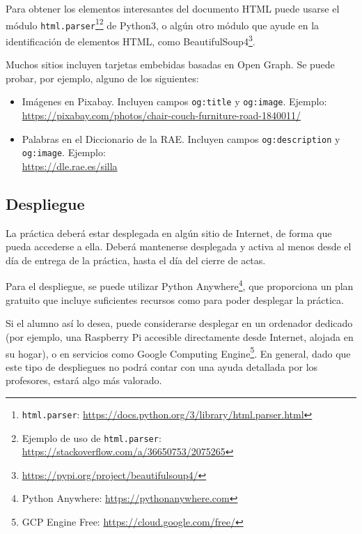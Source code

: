 Para obtener los elementos interesantes del documento HTML puede usarse el módulo \texttt{html.parser}\footnote{\texttt{html.parser}: \url{https://docs.python.org/3/library/html.parser.html}}\footnote{Ejemplo de uso de \texttt{html.parser}: \url{https://stackoverflow.com/a/36650753/2075265}} de Python3, o algún otro módulo que ayude en la identificación de elementos HTML, como BeautifulSoup4\footnote{\url{https://pypi.org/project/beautifulsoup4/}}.

Muchos sitios incluyen tarjetas embebidas basadas en Open Graph. Se puede probar, por ejemplo, alguno de los siguientes:

\begin{itemize}
\item Imágenes en Pixabay. Incluyen campos  \texttt{og:title} y \texttt{og:image}. Ejemplo: \\
  \url{https://pixabay.com/photos/chair-couch-furniture-road-1840011/}
\item Palabras en el Diccionario de la RAE. Incluyen campos  \texttt{og:description} y \texttt{og:image}. Ejemplo: \\
  \url{https://dle.rae.es/silla}
\end{itemize}

\subsection{Despliegue}
\label{sec:practica-2021-05:despliegue}

La práctica deberá estar desplegada en algún sitio de Internet, de forma que pueda accederse a ella. Deberá mantenerse desplegada y activa al menos desde el día de entrega de la práctica, hasta el día del cierre de actas.

Para el despliegue, se puede utilizar Python Anywhere\footnote{Python Anywhere: \url{https://pythonanywhere.com}}, que proporciona un plan gratuito que incluye suficientes recursos como para poder desplegar la práctica.

Si el alumno así lo desea, puede considerarse desplegar en un ordenador dedicado (por ejemplo, una Raspberry Pi accesible directamente desde Internet, alojada en su hogar), o en servicios como Google Computing Engine\footnote{GCP Engine Free: \url{https://cloud.google.com/free/}}. En general, dado que este tipo de despliegues no podrá contar con una ayuda detallada por los profesores, estará algo más valorado.

